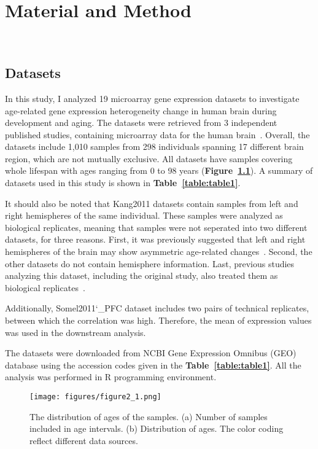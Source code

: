 \chapter{Material and Method}~\label{chp:b2}
\section{Datasets}
In this study, I analyzed 19 microarray gene expression datasets to investigate age-related gene expression heterogeneity change in human brain during development and aging.
The datasets were retrieved from 3 independent published studies, containing microarray data for the human brain~\cite{Colantuoni2011, Kang2011, Somel2011, Somel2010}.
Overall, the datasets include 1,010 samples from 298 individuals spanning 17 different brain region, which are not mutually exclusive.
All datasets have samples covering whole lifespan with ages ranging from 0 to 98 years (\textbf{Figure~\ref{fig:fig2.1}}).
A summary of datasets used in this study is shown in \textbf{Table~\ref{table:table1}}.

It should also be noted that Kang2011 datasets contain samples from left and right hemispheres of the same individual.
These samples were analyzed as biological replicates, meaning that samples were not seperated into two different datasets, for three reasons.
First, it was previously suggested that left and right hemispheres of the brain may show asymmetric age-related changes~\cite{Sun2005, Dolcos2002}.
Second, the other datasets do not contain hemisphere information.
Last, previous studies analyzing this dataset, including the original study, also treated them as biological replicates~\cite{Kang2011,Donertas2017}.

Additionally, Somel2011\char`_PFC dataset includes two pairs of technical replicates, between which the correlation was high. 
Therefore, the mean of expression values was used in the downstream analysis.

The datasets were downloaded from NCBI Gene Expression Omnibus (GEO) database using the accession codes given in the \textbf{Table~\ref{table:table1}}. 
All the analysis was performed in R programming environment.

\begin{figure}[h]
\centering
\texttt{[image: figures/figure2\_1.png]}
\caption{The distribution of ages of the samples. (a) Number of samples included in age intervals. (b) Distribution of ages. The color coding reflect different data sources. }\label{fig:fig2.1}
\end{figure}

